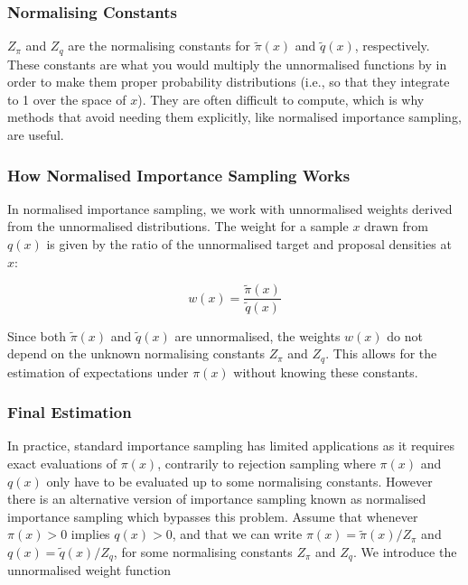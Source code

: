 \documentclass{article}
\begin{document}
\subsubsection{Normalising Constants}

\( Z_{\pi} \) and \( Z_q \) are the normalising constants for \( \tilde{\pi}(x) \) and \( \tilde{q}(x) \), respectively. These constants are what you would multiply the unnormalised functions by in order to make them proper probability distributions (i.e., so that they integrate to 1 over the space of \( x \)). They are often difficult to compute, which is why methods that avoid needing them explicitly, like normalised importance sampling, are useful.

\subsubsection{How Normalised Importance Sampling Works}

In normalised importance sampling, we work with unnormalised weights derived from the unnormalised distributions. The weight for a sample \( x \) drawn from \( q(x) \) is given by the ratio of the unnormalised target and proposal densities at \( x \):

\[ w(x) = \frac{\tilde{\pi}(x)}{\tilde{q}(x)} \]

Since both \( \tilde{\pi}(x) \) and \( \tilde{q}(x) \) are unnormalised, the weights \( w(x) \) do not depend on the unknown normalising constants \( Z_{\pi} \) and \( Z_q \). This allows for the estimation of expectations under \( \pi(x) \) without knowing these constants.

\subsubsection{Final Estimation}

In practice, standard importance sampling has limited applications as it requires exact evaluations of \( \pi(x) \), contrarily to rejection sampling where \( \pi(x) \) and \( q(x) \) only have to be evaluated up to some normalising constants. However there is an alternative version of importance sampling known as normalised importance sampling which bypasses this problem. Assume that whenever \( \pi(x) > 0 \) implies \( q(x) > 0 \), and that we can write \( \pi(x) = \tilde{\pi}(x)/Z_{\pi} \) and \( q(x) = \tilde{q}(x)/Z_q \), for some normalising constants \( Z_{\pi} \) and \( Z_q \). We introduce the unnormalised weight function
\end{document}
